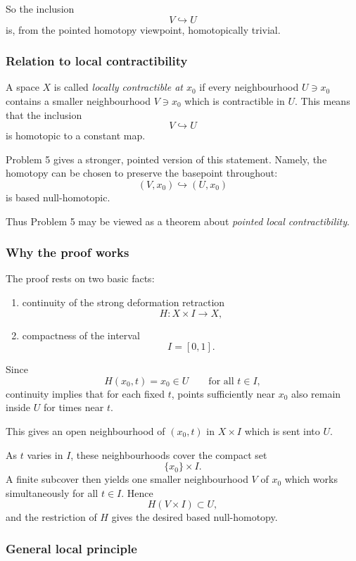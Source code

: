 \documentclass[12pt,a4paper]{article}
\theoremstyle{notespace}
\begin{document}
So the inclusion
\[
V\hookrightarrow U
\]
is, from the pointed homotopy viewpoint, homotopically trivial.

\subsubsection{Relation to local contractibility}

A space \(X\) is called \emph{locally contractible at \(x_0\)} if every neighbourhood \(U\ni x_0\) contains a smaller neighbourhood \(V\ni x_0\) which is contractible in \(U\). This means that the inclusion
\[
V\hookrightarrow U
\]
is homotopic to a constant map.

Problem 5 gives a stronger, pointed version of this statement. Namely, the homotopy can be chosen to preserve the basepoint throughout:
\[
(V,x_0)\hookrightarrow (U,x_0)
\]
is based null-homotopic.

Thus Problem 5 may be viewed as a theorem about \emph{pointed local contractibility}.

\subsubsection{Why the proof works}

The proof rests on two basic facts:

\begin{enumerate}
	\item continuity of the strong deformation retraction
	\[
	H:X\times I\to X,
	\]
	\item compactness of the interval
	\[
	I=[0,1].
	\]
\end{enumerate}

Since
\[
H(x_0,t)=x_0\in U
\qquad\text{for all }t\in I,
\]
continuity implies that for each fixed \(t\), points sufficiently near \(x_0\) also remain inside \(U\) for times near \(t\).

This gives an open neighbourhood of \((x_0,t)\) in \(X\times I\) which is sent into \(U\).

As \(t\) varies in \(I\), these neighbourhoods cover the compact set
\[
\{x_0\}\times I.
\]
A finite subcover then yields one smaller neighbourhood \(V\) of \(x_0\) which works simultaneously for all \(t\in I\). Hence
\[
H(V\times I)\subset U,
\]
and the restriction of \(H\) gives the desired based null-homotopy.

\subsubsection{General local principle}
\end{document}
